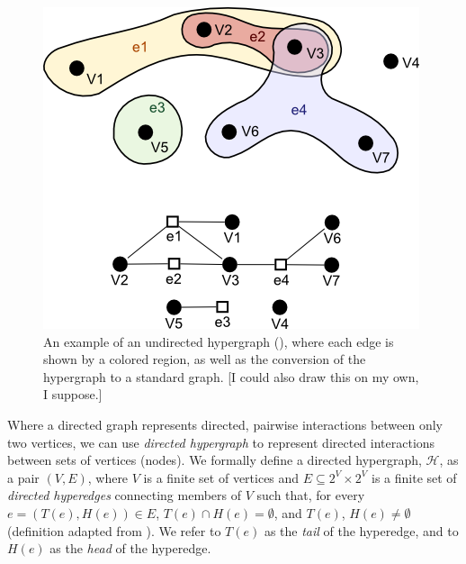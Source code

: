 \documentclass[12pt,twoside]{reedthesis}
\newcommand{\new}[2]{{\color{red}#1 [#2]}}
\theoremstyle{definition}
\begin{document}
\begin{figure}[thbp]
  \begin{center}
    \includegraphics[width=\textwidth/2]{undirected_hypergraph}
  \caption[An example undirected hypergraph]{\new{An example of an undirected hypergraph (\cite{sharpen}), where each edge is shown by a colored region, as well as the conversion of the hypergraph to a standard graph.}{I could also draw this on my own, I suppose.}}
  \label{fig:undirected_hypergraph}
  \end{center}
\end{figure}

Where a directed graph represents directed, pairwise interactions between only two vertices, we can use \textit{directed hypergraph} to represent directed interactions between sets of vertices (nodes). We formally define a directed hypergraph, $\mathcal{H}$, as a pair $(V,E)$, where $V$ is a finite set of vertices and $E \subseteq 2^V \times 2^V$ is a finite set of \textit{directed hyperedges} connecting members of $V$ such that, for every $e=(T(e),H(e)) \in E$, $T(e) \cap H(e) = \emptyset$, and $T(e)$, $H(e) \neq \emptyset$ (definition adapted from \cite{Gallo1993}).  We refer to $T(e)$ as the \textit{tail} of the hyperedge, and to $H(e)$ as the \textit{head} of the hyperedge.\par
\end{document}
